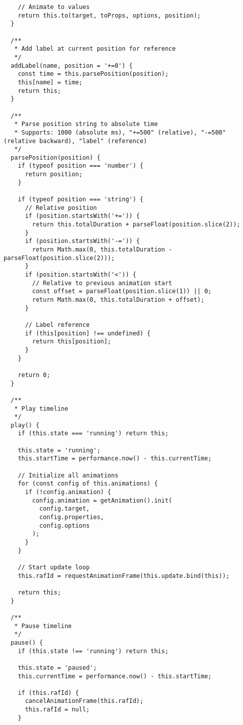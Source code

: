 \documentclass[11pt]{article}
\begin{document}
\begin{verbatim}
    // Animate to values
    return this.to(target, toProps, options, position);
  }
  
  /**
   * Add label at current position for reference
   */
  addLabel(name, position = '+=0') {
    const time = this.parsePosition(position);
    this[name] = time;
    return this;
  }
  
  /**
   * Parse position string to absolute time
   * Supports: 1000 (absolute ms), "+=500" (relative), "-=500" (relative backward), "label" (reference)
   */
  parsePosition(position) {
    if (typeof position === 'number') {
      return position;
    }
    
    if (typeof position === 'string') {
      // Relative position
      if (position.startsWith('+=')) {
        return this.totalDuration + parseFloat(position.slice(2));
      }
      if (position.startsWith('-=')) {
        return Math.max(0, this.totalDuration - parseFloat(position.slice(2)));
      }
      if (position.startsWith('<')) {
        // Relative to previous animation start
        const offset = parseFloat(position.slice(1)) || 0;
        return Math.max(0, this.totalDuration + offset);
      }
      
      // Label reference
      if (this[position] !== undefined) {
        return this[position];
      }
    }
    
    return 0;
  }
  
  /**
   * Play timeline
   */
  play() {
    if (this.state === 'running') return this;
    
    this.state = 'running';
    this.startTime = performance.now() - this.currentTime;
    
    // Initialize all animations
    for (const config of this.animations) {
      if (!config.animation) {
        config.animation = getAnimation().init(
          config.target,
          config.properties,
          config.options
        );
      }
    }
    
    // Start update loop
    this.rafId = requestAnimationFrame(this.update.bind(this));
    
    return this;
  }
  
  /**
   * Pause timeline
   */
  pause() {
    if (this.state !== 'running') return this;
    
    this.state = 'paused';
    this.currentTime = performance.now() - this.startTime;
    
    if (this.rafId) {
      cancelAnimationFrame(this.rafId);
      this.rafId = null;
    }
    

\end{verbatim}
\end{document}
